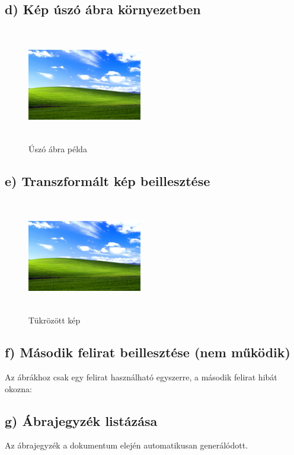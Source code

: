 \documentclass[a4paper,12pt]{article}
\begin{document}
\subsection{d) Kép úszó ábra környezetben}
\begin{figure}[h]
    \centering
    \includegraphics[width=5cm,height=5cm,keepaspectratio]{szines.jpg}
    \caption{Úszó ábra példa}
    \label{fig:floating}
\end{figure}

\subsection{e) Transzformált kép beillesztése}
\begin{figure}[h]
    \centering
    \includegraphics[width=5cm,height=5cm,keepaspectratio,angle=45]{szines.jpg} %
    \caption{Tükrözött kép}
    \label{fig:transformed}
\end{figure}

\subsection{f) Második felirat beillesztése (nem működik)}
Az ábrákhoz csak egy felirat használható egyszerre, a második felirat hibát okozna:

\subsection{g) Ábrajegyzék listázása}
Az ábrajegyzék a dokumentum elején automatikusan generálódott.
\end{document}
